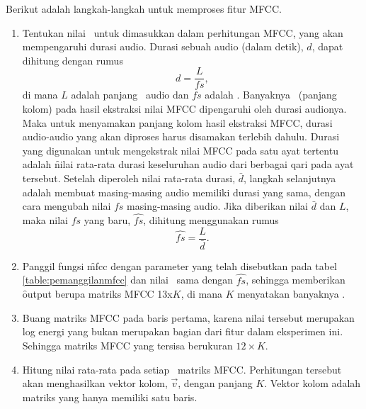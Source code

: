 Berikut adalah langkah-langkah untuk memproses fitur MFCC.
\begin{enumerate}
  \item Tentukan nilai \br~untuk dimasukkan dalam perhitungan MFCC, yang akan mempengaruhi durasi audio. Durasi sebuah audio (dalam detik), $d$, dapat dihitung dengan rumus
  \begin{equation}
    d = \frac{L}{fs}, 
  \end{equation}
  di mana $L$ adalah panjang \fr~audio dan $fs$ adalah \br. Banyaknya \fr~(panjang kolom) pada hasil ekstraksi nilai MFCC dipengaruhi oleh durasi audionya. Maka untuk menyamakan panjang kolom hasil ekstraksi MFCC, durasi audio-audio yang akan diproses harus disamakan terlebih dahulu. Durasi yang digunakan untuk mengekstrak nilai MFCC pada satu ayat tertentu adalah \f{nilai rata-rata durasi} keseluruhan audio dari berbagai qari pada ayat tersebut. Setelah diperoleh nilai rata-rata durasi, $\bar{d}$, langkah selanjutnya adalah membuat masing-masing audio memiliki durasi yang sama, dengan cara mengubah nilai $fs$ masing-masing audio. Jika diberikan nilai $\bar{d}$ dan $L$, maka nilai $fs$ yang baru, $\widehat{fs}$, dihitung menggunakan rumus
  \begin{equation}
    \widehat{fs} = \frac{L}{\bar{d}}.
  \end{equation}


	\item Panggil fungsi \f{mfcc} dengan parameter yang telah disebutkan pada tabel \ref{table:pemanggilanmfcc} dan nilai \br~sama dengan $\widehat{fs}$, sehingga memberikan \f{output} berupa matriks MFCC 13x$K$, di mana $K$ menyatakan banyaknya \fr.

	\item Buang matriks MFCC pada baris pertama, karena nilai tersebut merupakan log energi yang bukan merupakan bagian dari fitur dalam eksperimen ini. Sehingga matriks MFCC yang tersisa berukuran $12\times K$.

	\item Hitung nilai rata-rata pada setiap \fr~matriks MFCC. Perhitungan tersebut akan menghasilkan vektor kolom, $\vec v$, dengan panjang $K$. Vektor kolom adalah matriks yang hanya memiliki satu baris.


\end{enumerate}
